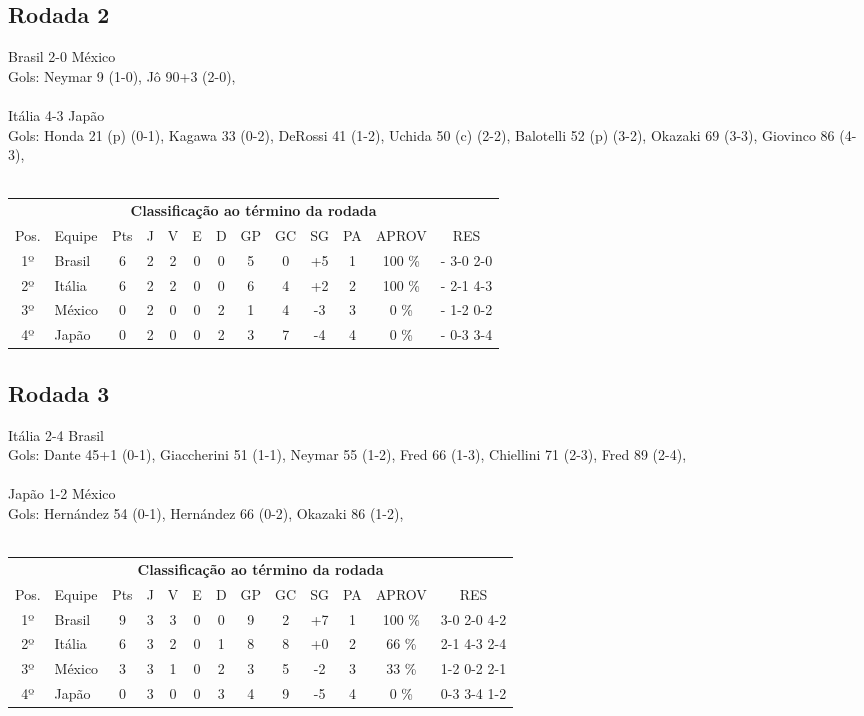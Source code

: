 \documentclass{article}
\begin{document}
\subsection*{Rodada 2}
Brasil 2-0 México\\
Gols: Neymar 9 (1-0), Jô 90+3 (2-0), \\
\\
Itália 4-3 Japão\\
Gols: Honda 21 (p) (0-1), Kagawa 33 (0-2), DeRossi 41 (1-2), Uchida 50 (c) (2-2), Balotelli 52 (p) (3-2), Okazaki 69 (3-3), Giovinco 86 (4-3), \\
\\
\begin{center}
\begin{tabular}{| c | l | c | c | c | c | c | c | c | c | c | c | c |}
\multicolumn{13}{c}{\textbf{Classificação ao término da rodada}}\\
Pos.&Equipe&Pts&J&V&E&D&GP&GC&SG&PA&APROV&RES\\
1º&Brasil              &6&2	&2&0&0	&5&0&+5	&1&100 \%	& - 3-0 2-0 \\
2º&Itália              &6&2	&2&0&0	&6&4&+2	&2&100 \%	& - 2-1 4-3 \\
3º&México              &0&2	&0&0&2	&1&4&-3	&3&  0 \%	& - 1-2 0-2 \\
4º&Japão               &0&2	&0&0&2	&3&7&-4	&4&  0 \%	& - 0-3 3-4 \\
\end{tabular}
\end{center}


\subsection*{Rodada 3}
Itália 2-4 Brasil\\
Gols: Dante 45+1 (0-1), Giaccherini 51 (1-1), Neymar 55 (1-2), Fred 66 (1-3), Chiellini 71 (2-3), Fred 89 (2-4), \\
\\
Japão 1-2 México\\
Gols: Hernández 54 (0-1), Hernández 66 (0-2), Okazaki 86 (1-2), \\
\\
\begin{center}
\begin{tabular}{| c | l | c | c | c | c | c | c | c | c | c | c | c |}
\multicolumn{13}{c}{\textbf{Classificação ao término da rodada}}\\
Pos.&Equipe&Pts&J&V&E&D&GP&GC&SG&PA&APROV&RES\\
1º&Brasil              &9&3	&3&0&0	&9&2&+7	&1&100 \%	&3-0 2-0 4-2 \\
2º&Itália              &6&3	&2&0&1	&8&8&+0	&2& 66 \%	&2-1 4-3 2-4 \\
3º&México              &3&3	&1&0&2	&3&5&-2	&3& 33 \%	&1-2 0-2 2-1 \\
4º&Japão               &0&3	&0&0&3	&4&9&-5	&4&  0 \%	&0-3 3-4 1-2 \\
\end{tabular}
\end{center}
\end{document}
